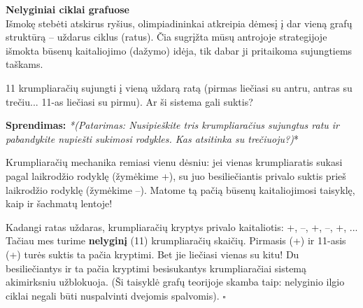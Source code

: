 \documentclass[11pt,a4paper]{scrartcl}
\newenvironment{solution}
    {\begin{list}{}{\setlength{\leftmargin}{10pt}\setlength{\rightmargin}{10pt}}\item[]}
    {\end{list}}
\begin{document}
\vspace{0.8cm}

\noindent \textbf{Nelyginiai ciklai grafuose} \\
Išmokę stebėti atskirus ryšius, olimpiadininkai atkreipia dėmesį į dar vieną grafų struktūrą – uždarus ciklus (ratus). Čia sugrįžta mūsų antrojoje strategijoje išmokta būsenų kaitaliojimo (dažymo) idėja, tik dabar ji pritaikoma sujungtiems taškams.

\vspace{0.3cm}

\begin{example}
11 krumpliaračių sujungti į vieną uždarą ratą (pirmas liečiasi su antru, antras su trečiu... 11-as liečiasi su pirmu). Ar ši sistema gali suktis?
\end{example}

\begin{minipage}{0.6\textwidth}
\begin{solution}
\textbf{Sprendimas:}
\textit{*(Patarimas: Nusipieškite tris krumpliaračius sujungtus ratu ir pabandykite nupiešti sukimosi rodykles. Kas atsitinka su trečiuoju?)}*

Krumpliaračių mechanika remiasi vienu dėsniu: jei vienas krumpliaratis sukasi pagal laikrodžio rodyklę (žymėkime +), su juo besiliečiantis privalo suktis prieš laikrodžio rodyklę (žymėkime –). Matome tą pačią būsenų kaitaliojimosi taisyklę, kaip ir šachmatų lentoje!

Kadangi ratas uždaras, krumpliaračių kryptys privalo kaitaliotis: +, –, +, –, +, ... 
Tačiau mes turime \textbf{nelyginį} (11) krumpliaračių skaičių. Pirmasis (+) ir 11-asis (+) turės suktis ta pačia kryptimi. Bet jie liečiasi vienas su kitu! Du besiliečiantys ir ta pačia kryptimi besisukantys krumpliaračiai sistemą akimirksniu užblokuoja. (Ši taisyklė grafų teorijoje skamba taip: nelyginio ilgio ciklai negali būti nuspalvinti dvejomis spalvomis). \hfill $\square$
\end{solution}
\end{minipage}
\hfill
\begin{minipage}{0.35\textwidth}
\centering
{}
\end{minipage}
\vspace{1cm}
\end{document}
